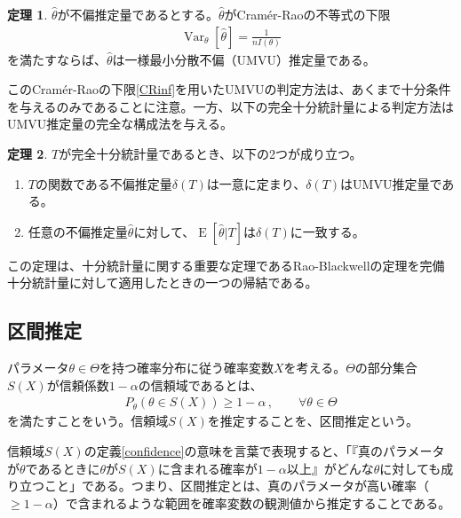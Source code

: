 \documentclass[11pt]{ltjsarticle}
\theoremstyle{definition}
\newtheorem{theorem}{定理}[section]
\DeclareMathOperator{\E}{E}
\DeclareMathOperator{\Var}{Var}
\begin{document}
\begin{theorem}\label{th:UMVU1}
    $\widehat{\theta}$が不偏推定量であるとする。$\widehat{\theta}$がCram\'{e}r-Raoの不等式の下限
    \begin{align}\label{CRinf}
        \Var_\theta[\widehat{\theta}] = \frac{1}{nI(\theta)}
    \end{align}
    を満たすならば、$\widehat{\theta}$は一様最小分散不偏（UMVU）推定量である。
\end{theorem}

このCram\'{e}r-Raoの下限\eqref{CRinf}を用いたUMVUの判定方法は、あくまで十分条件を与えるのみであることに注意。一方、以下の完全十分統計量による判定方法はUMVU推定量の完全な構成法を与える。

\begin{theorem}\label{th:UMVU2}
    $T$が完全十分統計量であるとき、以下の2つが成り立つ。
    \begin{enumerate}[(1)]
        \item $T$の関数である不偏推定量$\delta(T)$は一意に定まり、$\delta(T)$はUMVU推定量である。
        \item 任意の不偏推定量$\widehat{\theta}$に対して、$\E[\widehat{\theta}|T]$は$\delta(T)$に一致する。
    \end{enumerate}
\end{theorem}

この定理は、十分統計量に関する重要な定理であるRao-Blackwellの定理を完備十分統計量に対して適用したときの一つの帰結である。

\subsection{区間推定}
パラメータ$\theta\in\Theta$を持つ確率分布に従う確率変数$X$を考える。$\Theta$の部分集合$S(X)$が信頼係数$1-\alpha$の信頼域であるとは、
\begin{align}\label{confidence}
    P_\theta(\theta\in S(X))\ge 1-\alpha\,,\qquad \forall\theta\in\Theta
\end{align}
を満たすことをいう。信頼域$S(X)$を推定することを、区間推定という。

信頼域$S(X)$の定義\eqref{confidence}の意味を言葉で表現すると、「『真のパラメータが$\theta$であるときに$\theta$が$S(X)$に含まれる確率が$1-\alpha$以上』がどんな$\theta$に対しても成り立つこと」である。つまり、区間推定とは、真のパラメータが高い確率（$\ge 1-\alpha$）で含まれるような範囲を確率変数の観測値から推定することである。
\end{document}
